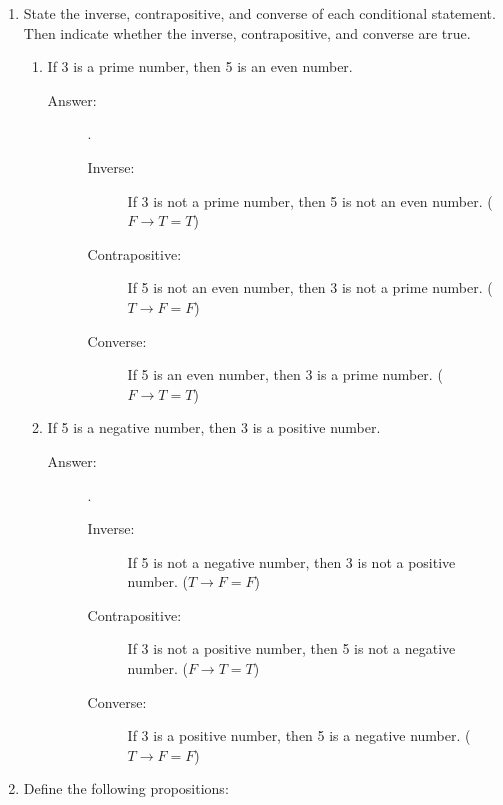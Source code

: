 \documentclass[12pt, oneside]{article}
\begin{document}
\begin{enumerate}
\item State the inverse, contrapositive, and converse of each conditional statement. Then indicate whether the inverse, contrapositive, and converse are true.
\begin{enumerate}
    \item If 3 is a prime number, then 5 is an even number.
    \begin{description}
        \item[Answer:] .
        \begin{description}
            \item[Inverse:] If 3 is not a prime number, then 5 is not an even number. ($F\rightarrow T = T$)
            \item[Contrapositive:] If 5 is not an even number, then 3 is not a prime number. ($T\rightarrow F = F$)
            \item[Converse:] If 5 is an even number, then 3 is a prime number. ($F\rightarrow T = T$)
        \end{description}
    \end{description}
    \item If 5 is a negative number, then 3 is a positive number.
    \begin{description}
        \item[Answer:] .
        \begin{description}
            \item[Inverse:] If 5 is not a negative number, then 3 is not a positive number. ($T\rightarrow F = F$)
            \item[Contrapositive:] If 3 is not a positive number, then 5 is not a negative number. ($F\rightarrow T = T$)
            \item[Converse:] If 3 is a positive number, then 5 is a negative number. ($T\rightarrow F = F$)
        \end{description}
    \end{description}
\end{enumerate}


\item Define the following propositions:


\end{enumerate}
\end{document}
